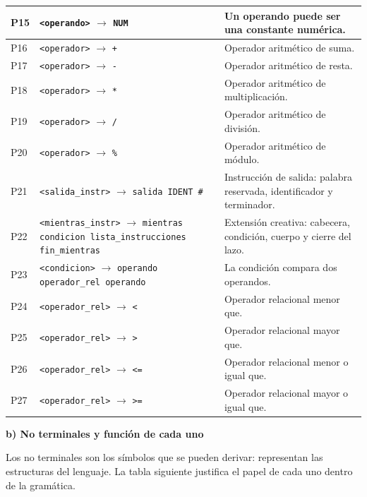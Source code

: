 \documentclass[11pt,letterpaper]{article}
\newcommand{\apartado}[1]{\par\Needspace{4\baselineskip}\medskip\noindent\textbf{#1}\par\nobreak\smallskip}
\newcommand{\nt}[1]{\texttt{\textless #1\textgreater}}
\newcommand{\regla}[2]{\nt{#1} $\rightarrow$ \texttt{#2}}
\begin{document}
\begin{longtable}{|L{1.2cm}|L{\dimexpr\textwidth-1.2cm-5.0cm-6\arrayrulewidth\relax}|L{5.0cm}|}
P15 & \regla{operando}{NUM} &
Un operando puede ser una constante numérica.\\\hline
P16 & \regla{operador}{+} & Operador aritmético de suma.\\\hline
P17 & \regla{operador}{-} & Operador aritmético de resta.\\\hline
P18 & \regla{operador}{*} & Operador aritmético de multiplicación.\\\hline
P19 & \regla{operador}{/} & Operador aritmético de división.\\\hline
P20 & \regla{operador}{\%} & Operador aritmético de módulo.\\\hline
P21 & \regla{salida\_instr}{salida IDENT \#} &
Instrucción de salida: palabra reservada, identificador y terminador.\\\hline
P22 & \regla{mientras\_instr}{mientras condicion lista\_instrucciones fin\_mientras} &
Extensión creativa: cabecera, condición, cuerpo y cierre del lazo.\\\hline
P23 & \regla{condicion}{operando operador\_rel operando} &
La condición compara dos operandos.\\\hline
P24 & \regla{operador\_rel}{<} & Operador relacional menor que.\\\hline
P25 & \regla{operador\_rel}{>} & Operador relacional mayor que.\\\hline
P26 & \regla{operador\_rel}{\textless=} & Operador relacional menor o igual que.\\\hline
P27 & \regla{operador\_rel}{\textgreater=} & Operador relacional mayor o igual que.\\\hline
\end{longtable}

\apartado{b) No terminales y función de cada uno}

Los no terminales son los símbolos que se pueden derivar: representan las estructuras del lenguaje.
La tabla siguiente justifica el papel de cada uno dentro de la gramática.
\end{document}
